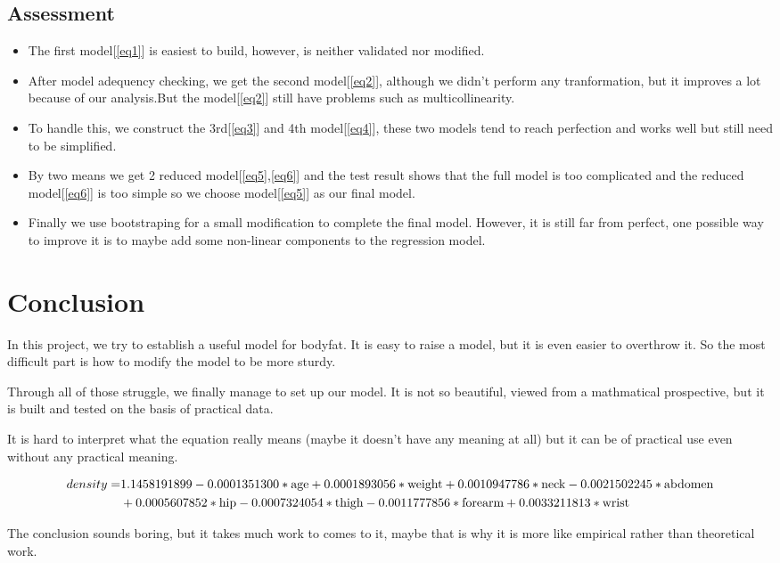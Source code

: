 \documentclass[11pt]{article}
\begin{document}
\subsection{Assessment}
\begin{itemize}
	\item The first model[\ref{eq1}] is easiest to build, however, is neither validated nor modified. 
	\item After model adequency checking, we get the second model[\ref{eq2}], although we didn't perform any tranformation, but it improves a lot because of our analysis.But the model[\ref{eq2}] still have problems such as multicollinearity.
	\item To handle this, we construct the 3rd[\ref{eq3}] and 4th model[\ref{eq4}], these two models tend to reach perfection and works well but still need to be simplified.
	\item By two means we get 2 reduced model[\ref{eq5},\ref{eq6}] and the test result shows that the full model is too complicated and the reduced model[\ref{eq6}] is too simple so we choose model[\ref{eq5}] as our final model.
	\item Finally we use bootstraping for a small modification to complete the final model. However, it is still far from perfect, one possible way to improve it is to maybe add some non-linear components to the regression model.
\end{itemize}

\section{Conclusion}

\noindent


In this project, we try to establish a useful model for bodyfat. It is easy to raise a model, but it is even easier to overthrow it. So the most difficult part is how to modify the model to be more sturdy.

Through all of those struggle, we finally manage to set up our model. It is not so beautiful, viewed from a mathmatical prospective, but it is built and tested on the basis of practical data. 

It is hard to interpret what the equation really means (maybe it doesn't have any meaning at all) but it can be of practical use even without any practical meaning.

\begin{align}
density = &1.1458191899-0.0001351300*\text{age}+0.0001893056*\text{weight}+0.0010947786 *\text{neck}-0.0021502245*\text{abdomen}\notag\\&+0.0005607852*\text{hip}-0.0007324054*\text{thigh}-0.0011777856*\text{forearm}+0.0033211813*\text{wrist}\notag
\end{align}

The conclusion sounds boring, but it takes much work to comes to it, maybe that is why it is more like empirical rather than theoretical work.
\end{document}
